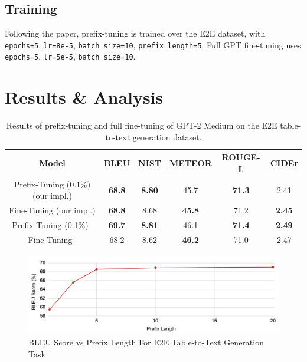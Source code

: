 \documentclass[11pt]{article} %
\begin{document}
\subsection{Training}
Following the paper, prefix-tuning is trained over the E2E dataset, with \texttt{epochs=5}, \texttt{lr=8e-5}, \texttt{batch\_size=10}, \texttt{prefix\_length=5}. Full GPT fine-tuning uses \texttt{epochs=5}, \texttt{lr=5e-5}, \texttt{batch\_size=10}.

\section{Results \& Analysis}

\begin{table}[H]
    \centering
    \begin{tabular}{c|ccccc}
        \textbf{Model} & \textbf{BLEU} & \textbf{NIST} & \textbf{METEOR} & \textbf{ROUGE-L} & \textbf{CIDEr} \\
        \hline
        Prefix-Tuning (0.1\%) (our impl.) & \textbf{68.8} & \textbf{8.80} & 45.7 & \textbf{71.3} & 2.41 \\
        Fine-Tuning (our impl.) & \textbf{68.8} & 8.68 & \textbf{45.8} & 71.2 & \textbf{2.45}\\
        \hline
        Prefix-Tuning (0.1\%)~\cite{li-liang-2021-prefix}  & \textbf{69.7} & \textbf{8.81} & 46.1 & \textbf{71.4} & \textbf{2.49} \\
        Fine-Tuning~\cite{li-liang-2021-prefix} & 68.2 & 8.62 & \textbf{46.2} & 71.0 & 2.47
    \end{tabular}
    \caption{Results of prefix-tuning and full fine-tuning of GPT-2 Medium on the E2E table-to-text generation dataset.}
    \label{tab:results}
\end{table}

\begin{figure}
    \centering
    \includegraphics[width=0.75\linewidth]{image.png}
    \caption{BLEU Score vs Prefix Length For E2E Table-to-Text Generation Task}
    \label{pref_len}
\end{figure}
\end{document}
